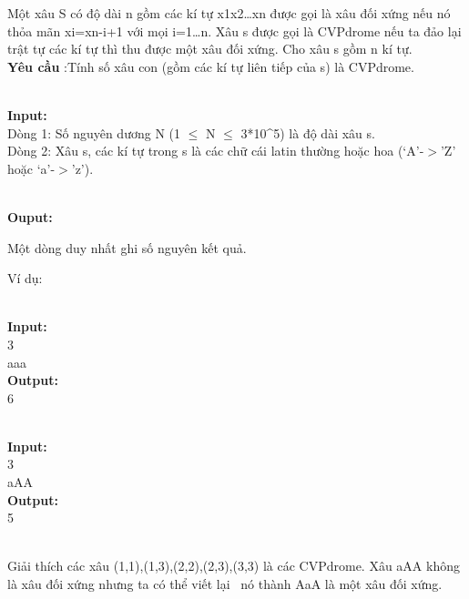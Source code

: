



   Một xâu S có độ dài n gồm các kí tự x1x2…xn được gọi là xâu đối xứng nếu nó thỏa mãn xi=xn-i+1 với mọi i=1…n. Xâu s được gọi là CVPdrome nếu ta đảo lại trật tự các kí tự thì thu được một xâu đối xứng. Cho xâu s gồm n kí tự.   
\\\textbf{    Yêu cầu   }   :Tính số xâu con (gồm các kí tự liên tiếp của s) là CVPdrome.  


\\\textbf{    Input:   }
\\   Dòng 1: Số nguyên dương N (1 $\le$ N $\le$ 3*10^5) là độ dài xâu s.   
\\   Dòng 2: Xâu s, các kí tự trong s là các chữ cái latin thường hoặc hoa (‘A’-$>$’Z’ hoặc ‘a’-$>$’z’).  


\\\textbf{    Ouput:   }

   Một dòng duy nhất ghi số nguyên kết quả.  

   Ví dụ:  


\\\textbf{    Input:   }
\\   3   
\\   aaa   
\\\textbf{    Output:   }
\\   6  


\\\textbf{    Input:   }
\\   3   
\\   aAA   
\\\textbf{    Output:   }
\\   5  


\\   Giải thích các xâu (1,1),(1,3),(2,2),(2,3),(3,3) là các CVPdrome. Xâu aAA không là xâu đối xứng nhưng ta có thể viết lại  nó thành AaA là một xâu đối xứng.  
